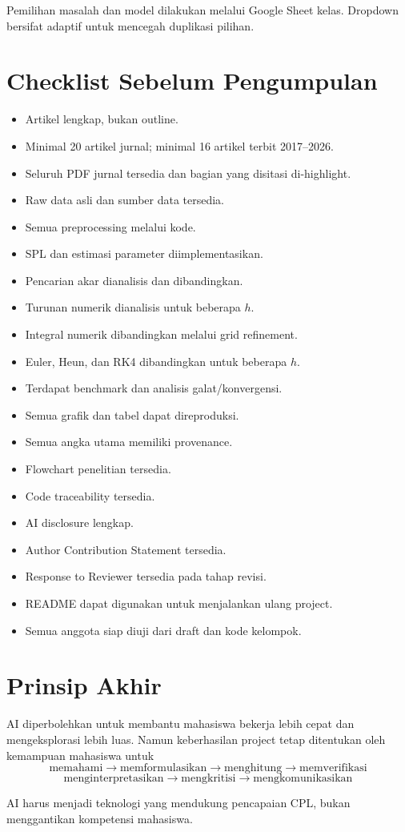 \documentclass[11pt,a4paper]{article}
\begin{document}
Pemilihan masalah dan model dilakukan melalui Google Sheet kelas. Dropdown bersifat adaptif untuk mencegah duplikasi pilihan.

\section{Checklist Sebelum Pengumpulan}

\begin{itemize}
    \item Artikel lengkap, bukan outline.
    \item Minimal 20 artikel jurnal; minimal 16 artikel terbit 2017--2026.
    \item Seluruh PDF jurnal tersedia dan bagian yang disitasi di-highlight.
    \item Raw data asli dan sumber data tersedia.
    \item Semua preprocessing melalui kode.
    \item SPL dan estimasi parameter diimplementasikan.
    \item Pencarian akar dianalisis dan dibandingkan.
    \item Turunan numerik dianalisis untuk beberapa $h$.
    \item Integral numerik dibandingkan melalui grid refinement.
    \item Euler, Heun, dan RK4 dibandingkan untuk beberapa $h$.
    \item Terdapat benchmark dan analisis galat/konvergensi.
    \item Semua grafik dan tabel dapat direproduksi.
    \item Semua angka utama memiliki provenance.
    \item Flowchart penelitian tersedia.
    \item Code traceability tersedia.
    \item AI disclosure lengkap.
    \item Author Contribution Statement tersedia.
    \item Response to Reviewer tersedia pada tahap revisi.
    \item README dapat digunakan untuk menjalankan ulang project.
    \item Semua anggota siap diuji dari draft dan kode kelompok.
\end{itemize}

\section{Prinsip Akhir}

AI diperbolehkan untuk membantu mahasiswa bekerja lebih cepat dan mengeksplorasi lebih luas. Namun keberhasilan project tetap ditentukan oleh kemampuan mahasiswa untuk
\[
\boxed{\text{memahami}\rightarrow\text{memformulasikan}\rightarrow\text{menghitung}\rightarrow\text{memverifikasi}}
\]
\[
\boxed{\text{menginterpretasikan}\rightarrow\text{mengkritisi}\rightarrow\text{mengkomunikasikan}}
\]

AI harus menjadi teknologi yang mendukung pencapaian CPL, bukan menggantikan kompetensi mahasiswa.
\end{document}
